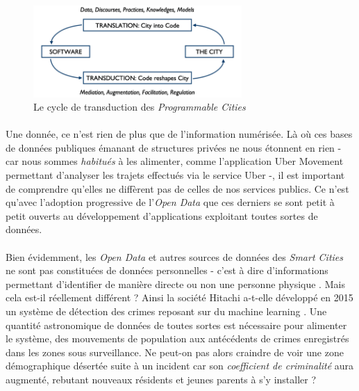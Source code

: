 \begin{figure}[h]
    \centering
    \includegraphics[width=300px]{chapters/01/images/programmable_city.png}
    \caption{\label{programmable_city} Le cycle de transduction des \emph{Programmable Cities}}
\end{figure}

\paragraph{} Une donnée, ce n'est rien de plus que de l'information numérisée. Là où ces bases de données publiques
émanant de structures privées ne nous étonnent en rien - car nous sommes \emph{habitués} à les alimenter, comme l'application
Uber Movement permettant d'analyser les trajets effectués via le service Uber -, il est important de comprendre
qu'elles ne diffèrent pas de celles de nos services publics. Ce n'est qu'avec l'adoption progressive de l'\emph{Open
Data} que ces derniers se sont petit à petit ouverts au développement d'applications exploitant toutes sortes de données. 

\paragraph{} Bien évidemment, les \emph{Open Data} et autres sources de données des \emph{Smart Cities} ne sont pas
constituées de données personnelles - c'est à dire d'informations permettant d'identifier de manière directe ou non une 
personne physique \cite{PersonalData0}. Mais cela est-il réellement différent ? Ainsi la société Hitachi a-t-elle développé
en 2015 un système de détection des crimes reposant sur du machine learning \cite{ProgrammableCity2}. Une quantité
astronomique de données de toutes sortes est nécessaire pour alimenter le système, des mouvements de population aux 
antécédents de crimes enregistrés dans les zones sous surveillance. Ne peut-on pas alors craindre de voir une zone 
démographique désertée suite à un incident car son \emph{coefficient de criminalité} aura augmenté, rebutant nouveaux
résidents et jeunes parents à s'y installer ?

